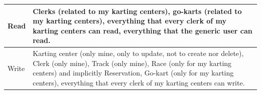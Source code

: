 \documentclass{beamer}
\begin{document}
\begin{frame}
    \begin{table}
        \tiny
        \begin{tabular}{|p{2cm}|p{6cm}|}
        \hline
        Read & Clerks (related to my karting centers), go-karts (related to my karting centers), 
        everything that every clerk of my karting centers can read,
        everything that the generic user can read. \\
        \hline
        Write & Karting center (only mine, only to update, not to create nor delete), 
        Clerk (only mine), Track (only mine), Race (only for my karting centers) and implicitly Reservation, 
        Go-kart (only for my karting centers),
        everything that every clerk of my karting centers can write. \\
        \hline
        \end{tabular}
    \end{table}
\end{frame}
\end{document}
